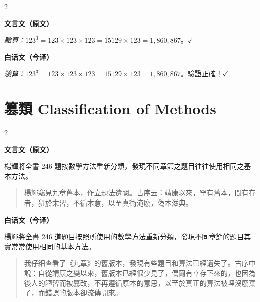 \documentclass[11pt,a4paper]{article}
\newcommand{\LeftLabel}{\begin{center}\textcolor{sectioncolor}{\small\textbf{文言文（原文）}}\end{center}\vspace{-0.5em}}
\newcommand{\RightLabel}{\begin{center}\textcolor{sectioncolor}{\small\textbf{白话文（今译）}}\end{center}\vspace{-0.5em}}
\newenvironment{classicalproblem}[1][]{%
  \par\smallskip%
  \noindent\textbf{\textcolor{problemframe}{問#1：}}%
}{%
  \par\smallskip
}
\newenvironment{modernproblem}[1][]{%
  \par\smallskip%
  \noindent\textbf{\textcolor{problemframe}{问题#1：}}%
}{%
  \par\smallskip
}
\begin{document}

\begin{paracol}{2}
\LeftLabel
{\small
\textit{驗算：}$123^3 = 123 \times 123 \times 123 = 15129 \times 123 = 1{,}860{,}867$。$\checkmark$
}

\switchcolumn
\RightLabel
{\small
\textit{驗算：}$123^3 = 123 \times 123 \times 123 = 15129 \times 123 = 1{,}860{,}867$。驗證正確！$\checkmark$
}

\end{paracol}

\newpage

\section{篡類 Classification of Methods}

\begin{paracol}{2}
\LeftLabel
{\small
楊輝將全書 246 題按數學方法重新分類，發現不同章節之題目往往使用相同之基本方法。

\begin{quote}\small
楊輝竊見九章舊本，作立題法遺闕。古序云：靖康以來，罕有舊本，間有存者，狃於末習，不循本意，以至真術淹廢，偽本滋典。
\end{quote}
}

\switchcolumn
\RightLabel
{\small
楊輝將全書 246 道題目按照所使用的數學方法重新分類，發現不同章節的題目其實常常使用相同的基本方法。

\begin{quote}\small
我仔細查看了《九章》的舊版本，發現有些題目和算法已經遺失了。古序中說：自從靖康之變以來，舊版本已經很少見了，偶爾有幸存下來的，也因為後人的陋習而被篡改，不再遵循原本的意思，以至於真正的算法被埋沒廢棄了，而錯誤的版本卻流傳開來。
\end{quote}
}

\end{paracol}
\end{document}
